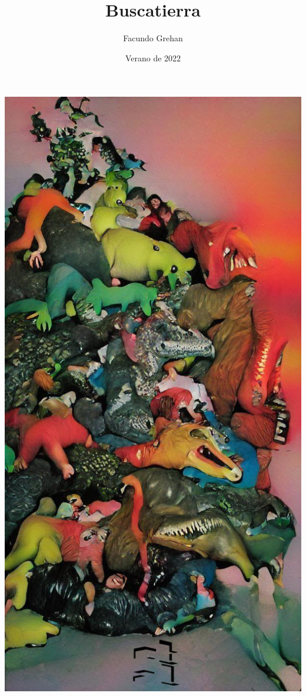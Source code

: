 \documentclass[
]{book}
\title{Buscatierra}
\author{Facundo Grehan}
\date{Verano de 2022}
\begin{document}
\maketitle

{
\setcounter{tocdepth}{1}
\tableofcontents
}
\hypertarget{section}{%
\chapter*{}\label{section}}

\includegraphics{images/portada.png}
\end{document}
